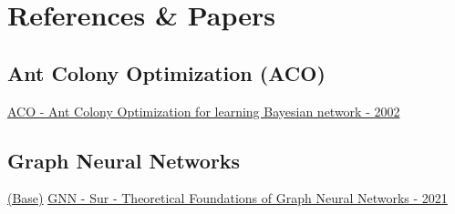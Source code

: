 \section{References \& Papers}
\subsection{Ant Colony Optimization (ACO)}
\href{https://www.sciencedirect.com/science/article/pii/S0888613X02000919}{ACO - Ant Colony Optimization for learning Bayesian network - 2002}

\subsection{Graph Neural Networks}
\underline{(Base)}
\href{https://www.youtube.com/watch?v=uF53xsT7mjc}{GNN - Sur - Theoretical Foundations of Graph Neural Networks - 2021}
\\
